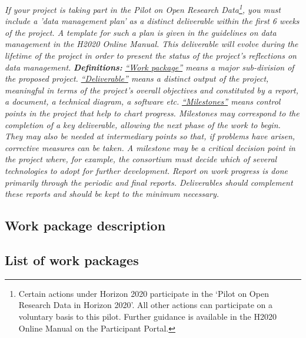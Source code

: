 {\vskip0.2cm
\emph{If your project is taking part in the Pilot on Open Research Data\footnote{Certain actions under Horizon 2020 participate in the ‘Pilot on Open Research Data in Horizon 2020’. All other actions can participate on a voluntary basis to this pilot.  Further guidance is available in the H2020 Online Manual on the Participant Portal.}, you must include a 'data management plan' as a distinct deliverable within the first 6 weeks of the project. A template for such a plan is given in the guidelines on data management in the H2020 Online Manual. This deliverable will evolve during the lifetime of the project in order to present the status of the project's reflections on data management.}
\vskip0.2cm
\emph{\noindent \textbf{Definitions:}}
\vskip0.2cm
\emph{\ul{``Work package''} means a major sub-division of the proposed project.}
\vskip0.2cm
\emph{\ul{``Deliverable''} means a distinct output of the project, meaningful in terms of the project's overall objectives and constituted by a report, a document, a technical diagram, a software etc.}
\vskip0.2cm
\emph{\ul{``Milestones''} means control points in the project that help to chart progress. Milestones may correspond to the completion of a key deliverable, allowing the next phase of the work to begin. They may also be needed at intermediary points so that, if problems have arisen, corrective measures can be taken. A milestone may be a critical decision point in the project where, for example, the consortium must decide which of several technologies to adopt for further development.}
\vskip0.2cm
\emph{\noindent Report on work progress is done primarily through the periodic and final reports. Deliverables should complement these reports and should be kept to the minimum necessary.}
}

%

\subsection{Work package description}
\label{sec:wps}








\subsection{List of work packages}
\label{sec:wplist}
\makewplist

